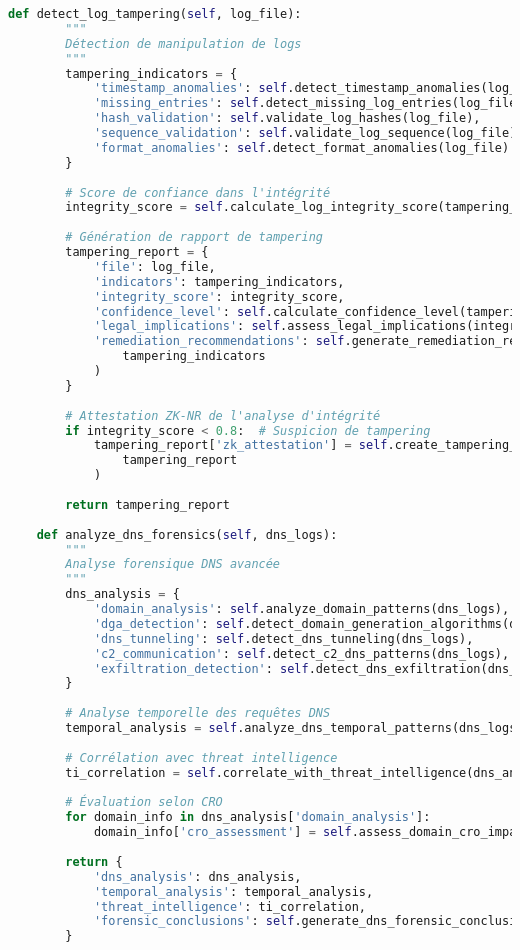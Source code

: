\begin{lstlisting}[language=Python, caption=Analyseur unifié de logs avec corrélation intelligente]
    def detect_log_tampering(self, log_file):
        """
        Détection de manipulation de logs
        """
        tampering_indicators = {
            'timestamp_anomalies': self.detect_timestamp_anomalies(log_file),
            'missing_entries': self.detect_missing_log_entries(log_file),
            'hash_validation': self.validate_log_hashes(log_file),
            'sequence_validation': self.validate_log_sequence(log_file),
            'format_anomalies': self.detect_format_anomalies(log_file)
        }
        
        # Score de confiance dans l'intégrité
        integrity_score = self.calculate_log_integrity_score(tampering_indicators)
        
        # Génération de rapport de tampering
        tampering_report = {
            'file': log_file,
            'indicators': tampering_indicators,
            'integrity_score': integrity_score,
            'confidence_level': self.calculate_confidence_level(tampering_indicators),
            'legal_implications': self.assess_legal_implications(integrity_score),
            'remediation_recommendations': self.generate_remediation_recommendations(
                tampering_indicators
            )
        }
        
        # Attestation ZK-NR de l'analyse d'intégrité
        if integrity_score < 0.8:  # Suspicion de tampering
            tampering_report['zk_attestation'] = self.create_tampering_attestation(
                tampering_report
            )
            
        return tampering_report
    
    def analyze_dns_forensics(self, dns_logs):
        """
        Analyse forensique DNS avancée
        """
        dns_analysis = {
            'domain_analysis': self.analyze_domain_patterns(dns_logs),
            'dga_detection': self.detect_domain_generation_algorithms(dns_logs),
            'dns_tunneling': self.detect_dns_tunneling(dns_logs),
            'c2_communication': self.detect_c2_dns_patterns(dns_logs),
            'exfiltration_detection': self.detect_dns_exfiltration(dns_logs)
        }
        
        # Analyse temporelle des requêtes DNS
        temporal_analysis = self.analyze_dns_temporal_patterns(dns_logs)
        
        # Corrélation avec threat intelligence
        ti_correlation = self.correlate_with_threat_intelligence(dns_analysis)
        
        # Évaluation selon CRO
        for domain_info in dns_analysis['domain_analysis']:
            domain_info['cro_assessment'] = self.assess_domain_cro_impact(domain_info)
            
        return {
            'dns_analysis': dns_analysis,
            'temporal_analysis': temporal_analysis,
            'threat_intelligence': ti_correlation,
            'forensic_conclusions': self.generate_dns_forensic_conclusions(dns_analysis)
        }
\end{lstlisting}

